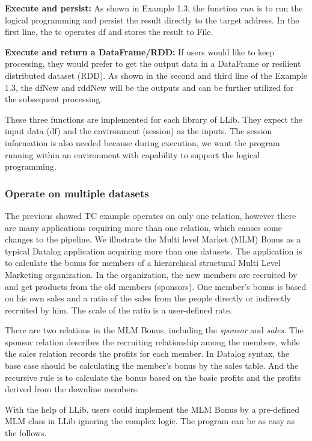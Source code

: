 \eldl

\textbf{Execute and persist:} As shown in Example 1.3, the function $run$ is to run the logical programming and persist the result directly to the target address. In the first line, the tc operates df and stores the result to File. 

\textbf{Execute and return a DataFrame/RDD:} If users would like to keep processing, they would prefer to get the output data in a DataFrame or resilient distributed dataset (RDD). As shown in the second and third line of the Example 1.3, the dfNew and rddNew will be the outputs and can be further utilized for the subsequent processing. 


These three functions are implemented for each library of LLib. They expect the input data (df) and the environment (session) as the inputs.  The session information is also needed because during execution, we want the program running within an environment with capability to support the logical 
programming. 


\subsubsection{Operate on multiple datasets}
\label{sec:multiple}
The previous showed TC example operates on only one relation, however there are many applications requiring more than one relation, which causes some changes to the  pipeline. We illustrate the Multi level Market (MLM) Bonus as a typical Datalog application \citep{mlm} acquiring more than one datasets. The application is to calculate the bonus for members of a hierarchical structural Multi Level Marketing  organization. In the organization, the new members are recruited by  and get products from the old members (sponsors). One member's bonus is based on his own sales and a ratio of the sales from the people directly or indirectly recruited by him. The scale of the ratio is a user-defined rate. 

There are two relations in the MLM Bonus, including the \textit{sponsor} and \textit{sales}. The sponsor relation describes the recruiting relationship among the members, while the sales relation records the profits for each member. In  Datalog syntax, the base case should be calculating the member's bonus by the sales table. And the recursive rule is to calculate the bonus based on the basic profits and the profits derived from the downline members.

With the help of LLib, users could implement the MLM Bonus by a pre-defined MLM class in LLib  ignoring the complex logic. The program can be as easy as the follows.

